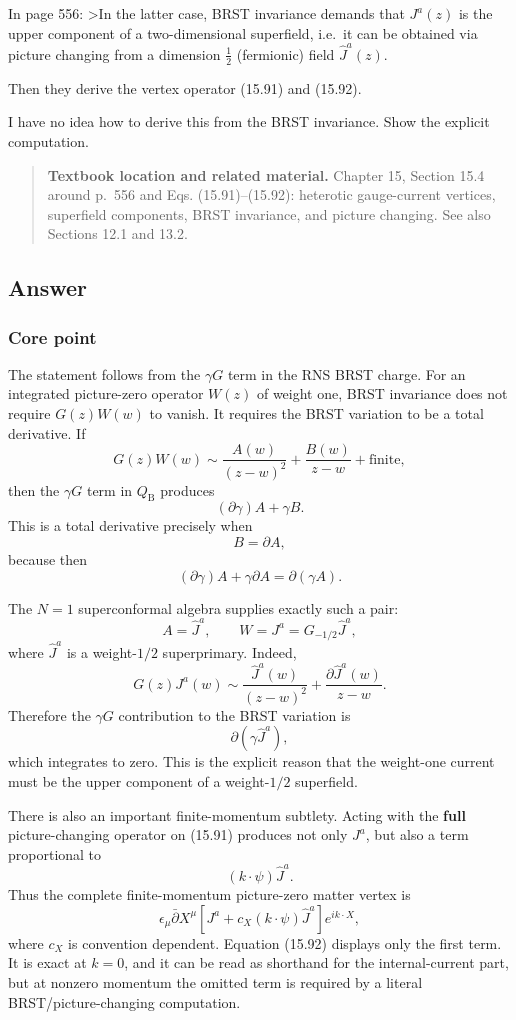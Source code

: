 \documentclass[
  10pt,
  a4paper,
  openany]{book}
\begin{document}
In page 556: \textgreater In the latter case, BRST invariance demands
that \(J^a(z)\) is the upper component of a two-dimensional superfield,
i.e.~it can be obtained via picture changing from a dimension
\(\frac{1}{2}\) (fermionic) field \(\hat{J}^a(z)\).

Then they derive the vertex operator (15.91) and (15.92).

I have no idea how to derive this from the BRST invariance. Show the
explicit computation.

\begin{quote}
\textbf{Textbook location and related material.} Chapter 15, Section
15.4 around p.~556 and Eqs. (15.91)--(15.92): heterotic gauge-current
vertices, superfield components, BRST invariance, and picture changing.
See also Sections 12.1 and 13.2.
\end{quote}

\subsection{Answer}\label{answer-29}

\subsubsection{Core point}\label{core-point-29}

The statement follows from the \(\gamma G\) term in the RNS BRST charge.
For an integrated picture-zero operator \(W(z)\) of weight one, BRST
invariance does not require \(G(z)W(w)\) to vanish. It requires the BRST
variation to be a total derivative. If \[
G(z)W(w)
\sim
\frac{A(w)}{(z-w)^2}
+
\frac{B(w)}{z-w}
+\text{finite},
\] then the \(\gamma G\) term in \(Q_{\mathrm B}\) produces \[
(\partial\gamma)A+\gamma B.
\] This is a total derivative precisely when \[
B=\partial A,
\] because then \[
(\partial\gamma)A+\gamma\partial A
=
\partial(\gamma A).
\]

The \(N=1\) superconformal algebra supplies exactly such a pair: \[
A=\hat J^a,
\qquad
W=J^a=G_{-1/2}\hat J^a,
\] where \(\hat J^a\) is a weight-\(1/2\) superprimary. Indeed, \[
G(z)J^a(w)
\sim
\frac{\hat J^a(w)}{(z-w)^2}
+
\frac{\partial\hat J^a(w)}{z-w}.
\] Therefore the \(\gamma G\) contribution to the BRST variation is \[
\partial\!\left(\gamma\hat J^a\right),
\] which integrates to zero. This is the explicit reason that the
weight-one current must be the upper component of a weight-\(1/2\)
superfield.

There is also an important finite-momentum subtlety. Acting with the
\textbf{full} picture-changing operator on (15.91) produces not only
\(J^a\), but also a term proportional to \[
(k\cdot\psi)\hat J^a.
\] Thus the complete finite-momentum picture-zero matter vertex is \[
\epsilon_\mu\bar\partial X^\mu
\left[
J^a+c_X(k\cdot\psi)\hat J^a
\right]e^{ik\cdot X},
\] where \(c_X\) is convention dependent. Equation (15.92) displays only
the first term. It is exact at \(k=0\), and it can be read as shorthand
for the internal-current part, but at nonzero momentum the omitted term
is required by a literal BRST/picture-changing computation.
\end{document}
